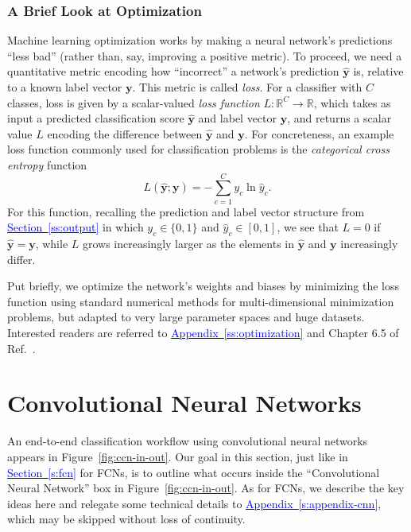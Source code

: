 \documentclass[11pt, a4paper]{article}
\newcommand{\myhref}[2]{\hyperref[#1]{\textcolor{blue}{#2}}}
\renewcommand{\vec}[1]{\bm{#1}}
\newcommand{\y}{\vec{y}}
\begin{document}
\subsubsection{A Brief Look at Optimization} \label{ss:optimization-brief}
Machine learning optimization works by making a neural network's predictions ``less bad'' (rather than, say, improving a positive metric).
To proceed, we need a quantitative metric encoding how ``incorrect'' a network's prediction $ \hat{\y} $ is, relative to a known label vector $ \y $.
This metric is called \textit{loss}.
For a classifier with $ C $ classes, loss is given by a scalar-valued \textit{loss function} $ L : \mathbb{R}^{C} \to \mathbb{R} $, which takes as input a predicted classification score $ \hat{\y} $ and label vector $ \y $, and returns a scalar value $ L $ encoding the difference between $ \hat{\y} $ and $ \y $.
For concreteness, an example loss function commonly used for classification problems is the \textit{categorical cross entropy} function
\begin{equation}
    L(\hat{\y}; \y) = - \sum_{c = 1}^{C} y_{c} \ln \hat{y}_{c}. \label{eq:loss-instance}
\end{equation}
For this function, recalling the prediction and label vector structure from \myhref{ss:output}{Section~\ref{ss:output}} in which $ y_{c} \in \{0, 1\} $ and $ \hat{y}_{c} \in [0, 1] $, we see that $ L = 0 $ if $ \hat{\y} = \y $, while $ L $ grows increasingly larger as the elements in $ \hat{\y} $ and $ \y $ increasingly differ.

Put briefly, we optimize the network's weights and biases by minimizing the loss function using standard numerical methods for multi-dimensional minimization problems, but adapted to very large parameter spaces and huge datasets.
Interested readers are referred to \myhref{ss:optimization}{Appendix~\ref{ss:optimization}} and Chapter 6.5 of Ref.~\cite{goodfellow}.

\section{Convolutional Neural Networks}
An end-to-end classification workflow using convolutional neural networks appears in Figure~\ref{fig:ccn-in-out}.
Our goal in this section, just like in \myhref{s:fcn}{Section~\ref{s:fcn}} for FCNs, is to outline what occurs inside the ``Convolutional Neural Network'' box in Figure~\ref{fig:ccn-in-out}.
As for FCNs, we describe the key ideas here and relegate some technical details to \myhref{s:appendix-cnn}{Appendix~\ref{s:appendix-cnn}}, which may be skipped without loss of continuity.  %
\end{document}
